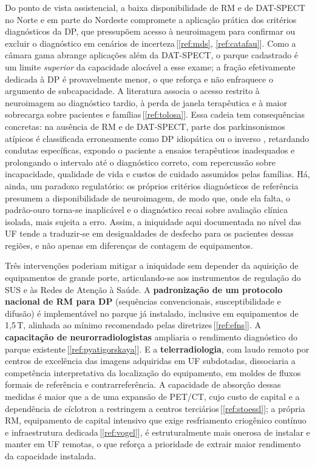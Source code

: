 \documentclass[12pt,a4paper,oneside]{article}
\begin{document}
Do ponto de vista assistencial, a baixa disponibilidade de RM e de
DAT-SPECT no Norte e em parte do Nordeste compromete a aplicação
prática dos critérios diagnósticos da DP, que pressupõem acesso à
neuroimagem para confirmar ou excluir o diagnóstico em cenários de
incerteza\,[\ref{ref:mds}, \ref{ref:catafau}]. Como a câmara gama
abrange aplicações além da DAT-SPECT, o parque cadastrado é um limite
\textit{superior} da capacidade alocável a esse exame; a fração
efetivamente dedicada à DP é provavelmente menor, o que reforça \textemdash{}
e não enfraquece \textemdash{} o argumento de subcapacidade. A
literatura associa o acesso restrito à neuroimagem ao diagnóstico
tardio, à perda de janela terapêutica e à maior sobrecarga sobre
pacientes e famílias\,[\ref{ref:tolosa}]. Essa cadeia tem
consequências concretas: na ausência de RM e de DAT-SPECT, parte dos
parkinsonismos atípicos é classificada erroneamente como DP idiopática
\textemdash{} ou o inverso \textemdash{}, retardando condutas
específicas, expondo o paciente a ensaios terapêuticos inadequados e
prolongando o intervalo até o diagnóstico correto, com repercussão
sobre incapacidade, qualidade de vida e custos de cuidado assumidos
pelas famílias. Há, ainda, um paradoxo regulatório: os próprios
critérios diagnósticos de referência presumem a disponibilidade de
neuroimagem, de modo que, onde ela falta, o padrão-ouro torna-se
inaplicável e o diagnóstico recai sobre avaliação clínica isolada,
mais sujeita a erro. Assim, a iniquidade aqui documentada no nível das
UF tende a traduzir-se em desigualdades de desfecho para os pacientes
dessas regiões, e não apenas em diferenças de contagem de equipamentos.

Três intervenções poderiam mitigar a iniquidade sem depender da
aquisição de equipamentos de grande porte, articulando-se aos
instrumentos de regulação do SUS e às Redes de Atenção à Saúde. A
\textbf{padronização de um protocolo nacional de RM para DP}
(sequências convencionais, susceptibilidade e difusão) é implementável
no parque já instalado, inclusive em equipamentos de 1,5\,T, alinhada
ao mínimo recomendado pelas diretrizes\,[\ref{ref:efns}]. A
\textbf{capacitação de neurorradiologistas} ampliaria o rendimento
diagnóstico do parque existente\,[\ref{ref:pyatigorskaya}]. E a
\textbf{telerradiologia}, com laudo remoto por centros de excelência
das imagens adquiridas em UF subdotadas, dissociaria a competência
interpretativa da localização do equipamento, em moldes de fluxos
formais de referência e contrarreferência. A capacidade de absorção
dessas medidas é maior que a de uma expansão de PET/CT, cujo custo de
capital e a dependência de cíclotron a restringem a centros
terciários\,[\ref{ref:stoessl}]; a própria RM, equipamento de capital
intensivo que exige resfriamento criogênico contínuo e infraestrutura
dedicada\,[\ref{ref:vogel}], é estruturalmente mais onerosa de instalar
e manter em UF remotas, o que reforça a prioridade de extrair maior
rendimento da capacidade instalada.
\end{document}
